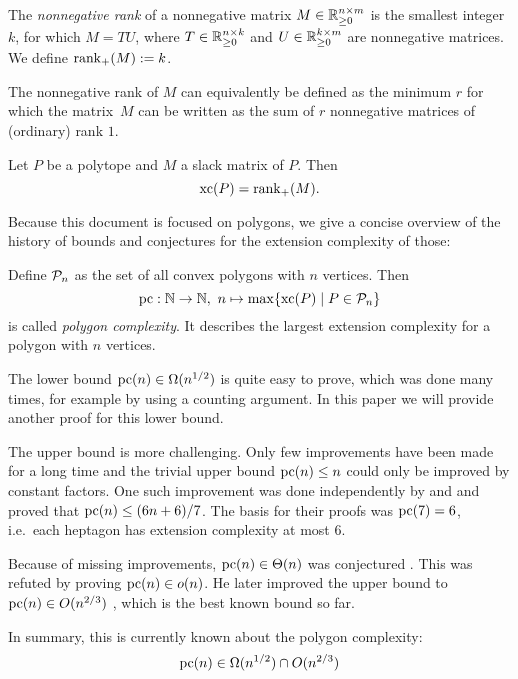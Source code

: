 \begin{definition}
  The \emph{nonnegative rank} of a nonnegative matrix ${M \in \R_{\geq 0}^{n \times m}}$ is the smallest integer $k$, for which $M = TU$, where $T \in \R_{\geq 0}^{n \times k}$ and $U \in \R_{\geq 0}^{k \times m}$ are nonnegative matrices.
  We define $\rank_+(M) := k$.
\end{definition}

The nonnegative rank of $M$ can equivalently be defined as the minimum $r$ for which the matrix~$M$ can be written as the sum of $r$ nonnegative matrices of (ordinary) rank $1$.

\begin{theorem}
  Let $P$ be a polytope and $M$ a slack matrix of $P$. Then $$\xc(P) = \rank_+(M) .$$
\end{theorem}

Because this document is focused on polygons, we give a concise overview of the history of bounds and conjectures for the extension complexity of those:

Define $\P_n$ as the set of all convex polygons with $n$ vertices. Then
$$\pc: \N \to \N,\ n \mapsto \max \{\xc(P) \mid P \in \P_n\}$$
is called \emph{polygon complexity}. It describes the largest extension complexity for a polygon with $n$ vertices.

The lower bound $\pc(n) \in \Omega(n^{1/2})$ is quite easy to prove, which was done many times, for example by \textcite{fiorini2012extended} using a counting argument. In this paper we will provide another proof for this lower bound.

The upper bound is more challenging. Only few improvements have been made for a long time and the trivial upper bound $\pc(n) \leq n$ could only be improved by constant factors. One such improvement was done independently by \textcite{shitov2014upper} and \textcite{padrol2014polygons} and proved that $\pc(n) \leq (6n+6)/7$. The basis for their proofs was $\pc(7)=6$, i.e.\ each heptagon has extension complexity at most 6.

Because of missing improvements, $\pc(n) \in \Theta(n)$ was conjectured \cite{fiorini2012extended}. This was refuted by \textcite{shitov2014sublinear} proving $\pc(n) \in o(n)$. He later improved the upper bound to $\pc(n) \in O(n^{2/3})$ \cite{shitov2020sublinear}, which is the best known bound so far.

In summary, this is currently known about the polygon complexity:
$$\pc(n) \in \Omega(n^{1/2}) \cap O(n^{2/3})$$

